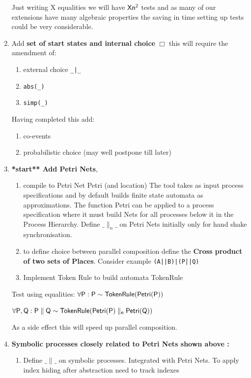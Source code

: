\documentclass[]{article}
\begin{document}
\begin{enumerate}
Just writing {\sf X} equalities we will  have ${\sf Xn^2}$ tests  and as many of our extensions have many algebraic properties  the saving in time setting up tests could be very considerable.

\item Add {\bf set of start states and internal choice} $\Box$  this will require the amendment of:
\begin{enumerate}
\item  external choice \verb$_|_$
\item  \verb|abs(_)|
\item \verb|simp(_)|
\end{enumerate}
Having completed this add:
\begin{enumerate}
\item co-events
\item probabilistic choice (may well postpone till later)
\end{enumerate}

\item {\bf **start** Add   Petri Nets},
\begin{enumerate}
\item compile to Petri Net {\sf Petri} (and location)  The tool takes as input process specifications and by default builds finite state automata as approximations.   The function {\sf Petri} can be applied to a process specification where it must build Nets for all processes below it in the {\sf Process Hierarchy}.   Define $\_\parallel_n\_$ on Petri Nets initially only for hand shake synchronisation.

\item to define choice between parallel composition define the {\bf Cross product of two sets of Places}. Consider example \verb$(A||B)|(P||Q)$

\item Implement Token Rule to build automata {\sf TokenRule}
\end{enumerate}
Test using equalities: $\sf \forall {\sf P} : P  \sim  TokenRule(Petri(P))$

$\sf \forall {\sf P, Q} : P\parallel Q  \sim  TokenRule(Petri(P)\parallel_n Petri(Q))$

 As a side effect this will speed up parallel composition.

\item {\bf Symbolic processes closely related to Petri Nets shown above :}
\begin{enumerate}
\item Define $\_\parallel\_$ on symbolic processes.  Integrated with Petri Nets. To  apply index hiding  after abstraction need to track indexes


\end{enumerate}
\end{enumerate}
\end{document}
